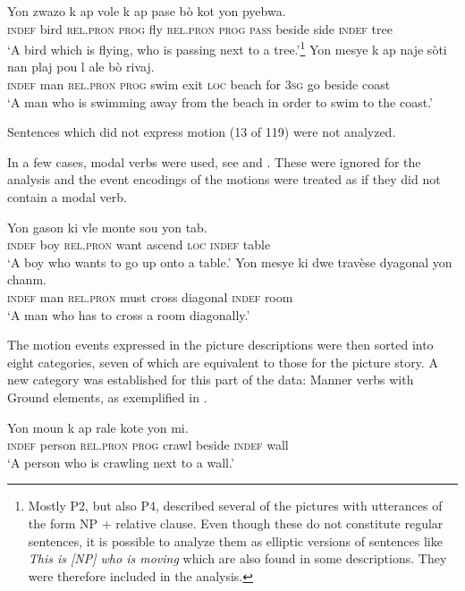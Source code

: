 \documentclass[output=paper,colorlinks,citecolor=brown]{langscibook}
\begin{document}
\ea\label{ex:3:27}
\gll Yon zwazo k ap vole k ap pase bò kot yon pyebwa.\\
\textsc{indef} bird \textsc{rel.pron} \textsc{prog} fly \textsc{rel.pron} \textsc{prog} \textsc{pass} beside side \textsc{indef} tree\\
\glt ‘A bird which is   flying, who is passing next to a tree.’\footnote{Mostly P2, but also P4, described several of the pictures with utterances of the form NP + relative clause. Even though these do not constitute regular sentences, it is possible to analyze them as elliptic versions of sentences like \emph{This is [NP] who is moving} which are also found in some descriptions. They were therefore included in the analysis.}
\ex\label{ex:3:28}
\gll Yon mesye k ap naje sòti nan plaj pou l ale bò rivaj. \\
\textsc{indef} man \textsc{rel.pron} \textsc{prog} swim exit \textsc{loc} beach for \textsc{3sg} go beside coast\\
\glt ‘A man who is swimming away from the beach in   order to swim to the coast.’
\z

Sentences which did not express motion (13 of 119) were not analyzed.

In a few cases, modal verbs were used, see  and . These were ignored for the analysis and the event encodings of the motions were treated as if they did not contain a modal verb.

\ea\label{ex:3:29}
\gll Yon gason ki vle monte sou yon tab.\\
      \textsc{indef} boy \textsc{rel.pron} want ascend \textsc{loc} \textsc{indef} table \\
\glt ‘A boy who wants to go up onto a table.’
\ex\label{ex:3:30} 
\gll Yon mesye ki dwe travèse dyagonal yon chanm. \\
     \textsc{indef} man \textsc{rel.pron} must cross diagonal \textsc{indef} room \\
\glt `A man who has to cross a room diagonally.'
\z

The motion events expressed in the picture descriptions were then sorted into eight categories, seven of which are equivalent to those for the picture story. A new category was established for this part of the data: Manner verbs with Ground elements, as exemplified in .

\ea \label{ex:3:31}
\gll  Yon moun k ap rale kote yon mi.\\
     \textsc{indef} person \textsc{rel.pron} \textsc{prog} crawl beside \textsc{indef} wall \\
\glt `A person who is crawling next to a wall.'
\z
\end{document}
